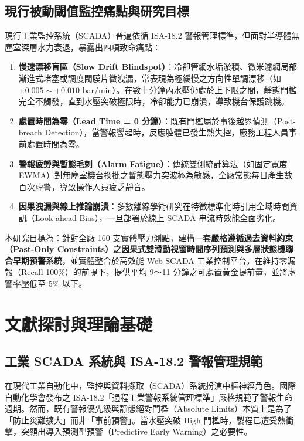\documentclass[fontset=none, a4paper, 12pt]{ctexart}
\begin{document}
\subsection{現行被動閾值監控痛點與研究目標}
現行工業監控系統（SCADA）普遍依循 ISA-18.2 警報管理標準，但面對半導體無塵室深層水力衰退，暴露出四項致命痛點：
\begin{enumerate}
    \item \textbf{慢速漂移盲區（Slow Drift Blindspot）}：冷卻管網水垢淤積、微米濾網局部漸進式堵塞或調度閥膜片微洩漏，常表現為極緩慢之方向性單調漂移（如 $+0.005 \sim +0.010$ bar/min）。在數十分鐘內水壓仍處於上下限之間，靜態門檻完全不觸發，直到水壓突破極限時，冷卻能力已崩潰，導致機台保護跳機。
    \item \textbf{處置時間為零（Lead Time = 0 分鐘）}：既有門檻屬於事後越界偵測（Post-breach Detection），當警報響起時，反應腔體已發生熱失控，廠務工程人員事前處置時間為零。
    \item \textbf{警報疲勞與暫態毛刺（Alarm Fatigue）}：傳統雙側統計算法（如固定寬度 EWMA）對無塵室機台換批之暫態壓力突波極為敏感，全廠常態每日產生數百次虛警，導致操作人員疲乏靜音。
    \item \textbf{因果洩漏與線上推論崩潰}：多數離線學術研究在特徵標準化時引用全域時間資訊（Look-ahead Bias），一旦部署於線上 SCADA 串流時效能全面劣化。
\end{enumerate}

本研究目標為：針對全廠 160 支實體壓力測點，建構一套\textbf{嚴格遵循過去資料約束（Past-Only Constraints）之因果式雙滑動視窗時間序列預測與多層狀態機聯合早期預警系統}，並實體整合於高效能 Web SCADA 工業控制平台，在維持零漏報（Recall 100\%）的前提下，提供平均 9～11 分鐘之可處置黃金提前量，並將虛警率壓低至 5\% 以下。

\section{文獻探討與理論基礎}

\subsection{工業 SCADA 系統與 ISA-18.2 警報管理規範}
在現代工業自動化中，監控與資料擷取（SCADA）系統扮演中樞神經角色。國際自動化學會發布之 ISA-18.2「過程工業警報系統管理標準」嚴格規範了警報生命週期。然而，既有警報優先級與靜態絕對門檻（Absolute Limits）本質上是為了「防止災難擴大」而非「事前預警」。當水壓突破 High 門檻時，製程已遭受熱衝擊，突顯出導入預測型預警（Predictive Early Warning）之必要性。
\end{document}

